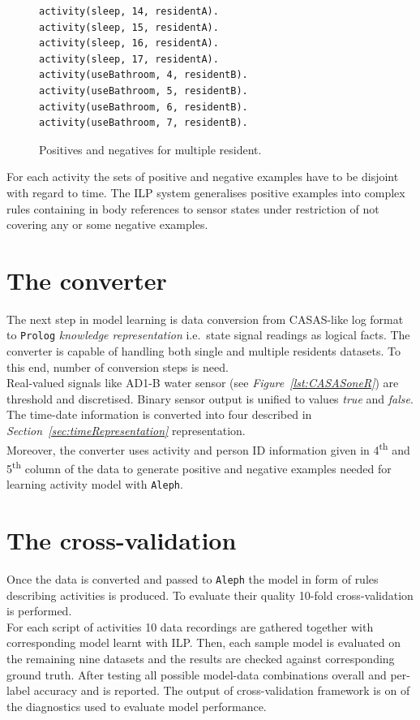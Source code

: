\documentclass[11pt, a4paper, pdflatex, leqno, twoside, openright]{report}
\newcommand{\ts}{\textsuperscript}
\begin{document}
\begin{figure}[htb] %
  \begin{verbatim}
activity(sleep, 14, residentA).
activity(sleep, 15, residentA).
activity(sleep, 16, residentA).
activity(sleep, 17, residentA).
activity(useBathroom, 4, residentB).
activity(useBathroom, 5, residentB).
activity(useBathroom, 6, residentB).
activity(useBathroom, 7, residentB).
  \end{verbatim}
  \caption{Positives and negatives for multiple resident.\label{lst:multiposneg}}
\end{figure}

For each activity the sets of positive and negative examples have to be disjoint with regard to time. The ILP system generalises positive examples into complex rules containing in body references to sensor states under restriction of not covering any or some negative examples.

  \section{The converter}
The next step in model learning is data conversion from CASAS-like log format to \texttt{Prolog} \emph{knowledge representation} i.e.\ state signal readings as logical facts. The converter is capable of handling both single and multiple residents datasets. To this end, number of conversion steps is need.\\

Real-valued signals like AD1-B water sensor (see \emph{Figure~\ref{lst:CASASoneR}}) are threshold and discretised. Binary sensor output is unified to values \emph{true} and \emph{false}. The time-date information is converted into four described in \emph{Section~\ref{sec:timeRepresentation}} representation.\\
Moreover, the converter uses activity and person ID information given in 4\ts{th} and 5\ts{th} column of the data to generate positive and negative examples needed for learning activity model with \texttt{Aleph}.

  \section{The cross-validation}
Once the data is converted and passed to \texttt{Aleph} the model in form of rules describing activities is produced. To evaluate their quality 10-fold cross-validation is performed.\\
For each script of activities 10 data recordings are gathered together with corresponding model learnt with ILP. Then, each sample model is evaluated on the remaining nine datasets and the results are checked against corresponding ground truth. After testing all possible model-data combinations overall and per-label accuracy and is reported. The output of cross-validation framework is on of the diagnostics used to evaluate model performance.
\end{document}
